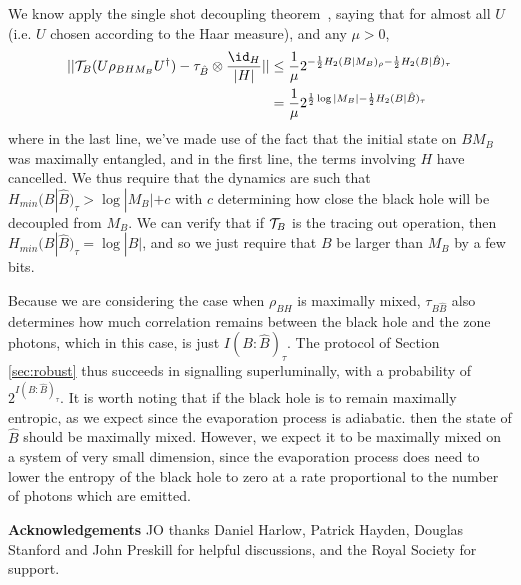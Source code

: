 \documentclass[12pt,a4paper]{article}
\begin{document}
We know apply the single shot decoupling theorem~\cite{dupuis2010one}, saying that for almost all $U$ (i.e. $U$ chosen according to the Haar measure), and any $\mu>0$,
\begin{align}
||{\cal T}_B(U\rho_{BHM_B}U^\dagger)-\tau_{{\hat B}}\otimes\frac{\id_H}{|H|}||
&\leq
\frac{1}{\mu} 2^{
-\frac{1}{2}H_2(B|M_B)_\rho-\frac{1}{2}H_{2}(B|{\hat B})_\tau
}\\
&=
\frac{1}{\mu} 2^{\frac{1}{2}\log|M_B|
- \frac{1}{2}H_{2}(B|{\hat B})_\tau
}
\end{align}
where in the last line, we've made use of the fact that the initial state on $BM_B$ was maximally entangled, and in the first line, the terms involving $H$ have cancelled.
We thus require that the dynamics are such that $H_{min}(B|{\hat B})_\tau>\log|M_B|+c$ with $c$ determining how close the black hole will be decoupled from $M_B$.
We can verify that if  ${\cal T}_B$ is the tracing out operation, then $H_{min}(B|{\hat B})_\tau=\log|B|$, and so we just require that $B$ be larger than $M_B$ by a few bits.

 Because we are considering the case when $\rho_{BH}$ is maximally mixed, $\tau_{B{\hat B}}$ also determines how much correlation remains between the black hole and the zone photons, which in this case, is just $I(B:{\hat B})_\tau$. The protocol
 of Section \ref{sec:robust} thus succeeds in signalling superluminally, with a probability of $2^{I(B:{\hat B})_\tau}$. It is worth noting that if the black hole is to remain
 maximally entropic, as we expect since the evaporation process is adiabatic. then the state of $\hat B$ should be maximally mixed.  However, we expect it to be maximally
 mixed on a system of very small dimension, since the evaporation process does need to lower the entropy of the black hole to zero at a rate proportional to the number of photons
 which are emitted.



\setcounter{secnumdepth}{3} 
{\bf Acknowledgements} 
JO thanks Daniel Harlow, Patrick Hayden, Douglas Stanford and John Preskill for helpful discussions, and the Royal Society for support.

%

\end{document}
